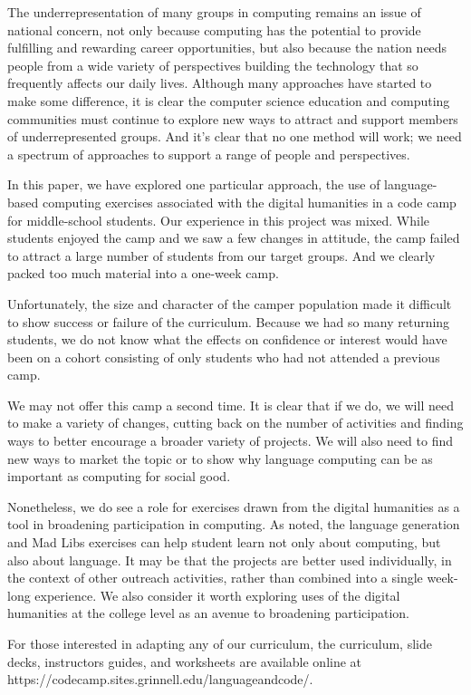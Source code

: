 The underrepresentation of many groups in computing remains an issue
of national concern, not only because computing has the potential
to provide fulfilling and rewarding career opportunities, but also
because the nation needs people from a wide variety of perspectives
building the technology that so frequently affects our daily lives.
Although many approaches have started to make some difference, it
is clear the computer science education and computing communities
must continue to explore new ways to attract and support members
of underrepresented groups.  And it's clear that no one method will
work; we need a spectrum of approaches to support a range of
people and perspectives.

In this paper, we have explored one particular approach, the use
of language-based computing exercises associated with the digital
humanities in a code camp for middle-school students.  Our experience
in this project was mixed.  While students enjoyed the camp
and we saw a few changes in attitude, the camp failed to attract a
large number of students from our target groups.  And we clearly
packed too much material into a one-week camp.

Unfortunately, the size and character of the camper population made
it difficult to show success or failure of the curriculum.  Because
we had so many returning students, we do not know what the effects
on confidence or interest would have been on a cohort consisting
of only students who had not attended a previous camp.

We may not offer this camp a second time.  It is clear that if we
do, we will need to make a variety of changes, cutting back on the
number of activities and finding ways to better encourage a broader
variety of projects.  We will also need to find new ways to market
the topic or to show why language computing can be as important as
computing for social good.

Nonetheless, we do see a role for exercises drawn from the digital
humanities as a tool in broadening participation in computing.  As
noted, the language generation and Mad Libs exercises can help
student learn not only about computing, but also about language.
It may be that the projects are better used individually, in the
context of other outreach activities, rather than combined into a
single week-long experience.  We also consider it worth exploring
uses of the digital humanities at the college level as an avenue
to broadening participation.

For those interested in adapting any of our curriculum, the curriculum,
slide decks, instructors guides, and worksheets are available online
at https://codecamp.sites.grinnell.edu/languageandcode/.
